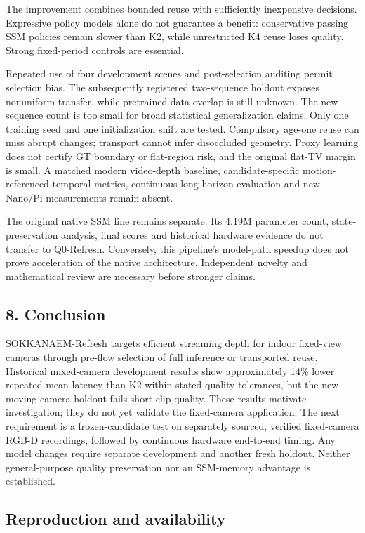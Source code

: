 \documentclass[
  10pt,
]{article}
\begin{document}
The improvement combines bounded reuse with sufficiently inexpensive
decisions. Expressive policy models alone do not guarantee a benefit:
conservative passing SSM policies remain slower than K2, while
unrestricted K4 reuse loses quality. Strong fixed-period controls are
essential.

Repeated use of four development scenes and post-selection auditing
permit selection bias. The subsequently registered two-sequence holdout
exposes nonuniform transfer, while pretrained-data overlap is still
unknown. The new sequence count is too small for broad statistical
generalization claims. Only one training seed and one initialization
shift are tested. Compulsory age-one reuse can miss abrupt changes;
transport cannot infer disoccluded geometry. Proxy learning does not
certify GT boundary or flat-region risk, and the original flat-TV margin
is small. A matched modern video-depth baseline, candidate-specific
motion-referenced temporal metrics, continuous long-horizon evaluation
and new Nano/Pi measurements remain absent.

The original native SSM line remains separate. Its 4.19M parameter
count, state-preservation analysis, final scores and historical hardware
evidence do not transfer to Q0-Refresh. Conversely, this pipeline's
model-path speedup does not prove acceleration of the native
architecture. Independent novelty and mathematical review are necessary
before stronger claims.

\subsection{8. Conclusion}\label{conclusion}

SOKKANAEM-Refresh targets efficient streaming depth for indoor
fixed-view cameras through pre-flow selection of full inference or
transported reuse. Historical mixed-camera development results show
approximately 14\% lower repeated mean latency than K2 within stated
quality tolerances, but the new moving-camera holdout fails short-clip
quality. These results motivate investigation; they do not yet validate
the fixed-camera application. The next requirement is a frozen-candidate
test on separately sourced, verified fixed-camera RGB-D recordings,
followed by continuous hardware end-to-end timing. Any model changes
require separate development and another fresh holdout. Neither
general-purpose quality preservation nor an SSM-memory advantage is
established.

\subsection{Reproduction and
availability}\label{reproduction-and-availability}
\end{document}

